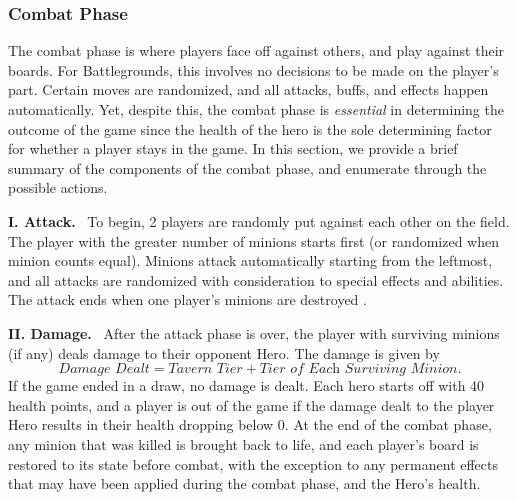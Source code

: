\documentclass{paper}
\newcommand{\inlineSection}[1]{\vspace{0.5em}\noindent\textbf{#1.}~}
\begin{document}
\subsubsection{Combat Phase}
The combat phase is where players face off against others, and play against their boards. For Battlegrounds, this involves no decisions to be made on the player's part. Certain moves are randomized, and all attacks, buffs, and effects happen automatically. Yet, despite this, the combat phase is \textit{essential} in determining the outcome of the game since the health of the hero is the sole determining factor for whether a player stays in the game. In this section, we provide a brief summary of the components of the combat phase, and enumerate through the possible actions.

\inlineSection{I. Attack}
To  begin, 2 players are randomly put against each other on the field. The player with the greater number of minions starts first (or randomized when minion counts equal). Minions attack automatically starting from the leftmost, and all attacks are randomized with consideration to special effects and abilities. The attack ends when one player's minions are destroyed \cite{battlegrounds2019}.

\inlineSection{II. Damage}
After the attack phase is over, the player with surviving minions (if any) deals damage to their opponent Hero. The damage is given by
$$
\textit{Damage Dealt} = \textit{Tavern Tier} + \textit{Tier of Each Surviving Minion}.
$$
If the game ended in a draw, no damage is dealt.  Each hero starts off with 40 health points, and a player is out of the game if the damage dealt to  the player Hero results in their health dropping below 0. At the end of the combat phase, any minion that was killed is brought back to life, and each player's board is restored to its state before combat, with the exception to any permanent effects that may have been applied during the combat phase, and the Hero's health.


\medskip
\end{document}
